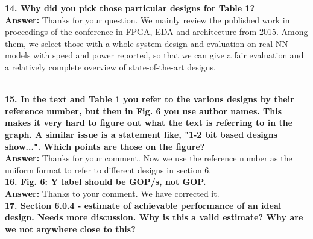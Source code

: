 \documentclass[12pt]{paper}
\newcommand{\rev}[1]{{{\color[rgb]{0,0,1}{#1}}}}
\newcommand{\answer}[1]{\noindent\textbf{Answer:} #1}
\newcommand{\comment}[1]{\noindent\textbf{#1}\\}
\begin{document}
\comment{14. Why did you pick those particular designs for Table 1?}

\answer{Thanks for your question. We mainly review the published work in proceedings of the conference in FPGA, EDA and architecture from 2015. Among them, we select those with a whole system design and evaluation on real NN models with speed and power reported, so that we can give a fair evaluation and a relatively complete overview of state-of-the-art designs.

\rev{We mainly reviewed the FPGA based designs published in the top FPGA conferences (FPGA, FCCM, FPL, FPT), EDA conferences (DAC, ASPDAC, DATE, ICCAD), architecture conferences (MICRO, HPCA, ISCA, ASPLOS) since 2015. Because of the diversity in the adopted techniques, target FPGA chips, and experiments, we need to tradeoff between the fairness of comparison and the number of designs we can use. In this paper, we pick the designs with: 1) whole system implementation; 2) experiments on real NN models with reported speed, power, and energy efficiency.} }\\

\comment{15. In the text and Table 1 you refer to the various designs by their reference number, but then in Fig. 6 you use author names. This makes it very hard to figure out what the text is referring to in the graph. A similar issue is a statement like, "1-2 bit based designs show...".  Which points are those on the figure?}

\answer{Thanks for your comment. Now we use the reference number as the uniform format to refer to different designs in section 6.} \\

\comment{16. Fig. 6: Y label should be GOP/s, not GOP.}

\answer{Thanks to your comment. We have corrected it.}\\

\comment{17. Section 6.0.4 - estimate of achievable performance of an ideal design. Needs more discussion. Why is this a valid estimate? Why are we not anywhere close to this?}
\end{document}
